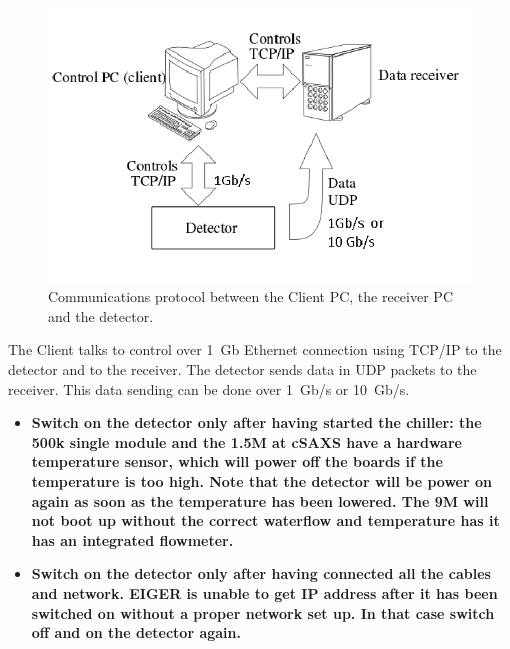 \documentclass{article}
\begin{document}
\begin{figure}[t]
\begin{center}
\includegraphics[width=.8\textwidth]{Client2}
\end{center}
\caption{Communications protocol between the Client PC, the receiver PC and the detector.}
\label{fig:1}
\end{figure}

The Client talks to control over 1~Gb Ethernet connection using TCP/IP to the detector and to the receiver. The detector sends data in UDP packets to the receiver. This data sending can be done over 1~Gb/s or 10~Gb/s. 
 
\begin{itemize}
\item \textbf{Switch on the detector only after having started the chiller: the 500k single module and the 1.5M at cSAXS have a hardware temperature sensor, which will power off the boards if the temperature is too high. Note that the detector will be power on again as soon as the temperature has been lowered. The 9M will not boot up without the correct waterflow and temperature has it has an integrated flowmeter.} 
\item \textbf{Switch on the detector only after having connected all the cables and network. EIGER is unable to get IP address after it has been switched on without a proper network set up. In that case switch off and on the detector again.}
\end{itemize}
\end{document}
